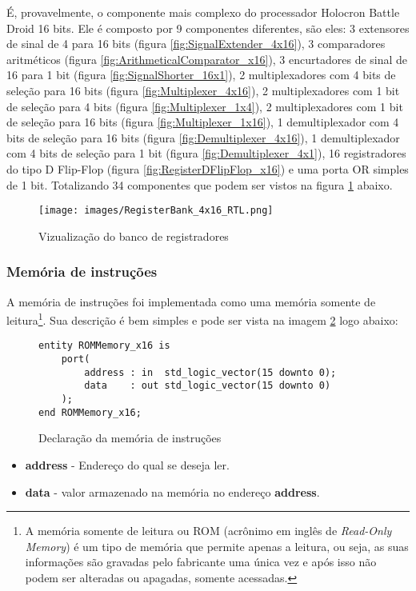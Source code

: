 \documentclass{article}
\newcommand\tab[1][0.50cm]{\hspace*{#1}}
\begin{document}
				\tab \'{E}, provavelmente, o componente mais complexo do processador Holocron Battle Droid 16 bits. Ele \'{e} composto por 9 componentes diferentes, s\~{a}o eles: 3 extensores de sinal de 4 para 16 bits (figura \ref{fig:SignalExtender_4x16}), 3 comparadores aritm\'{e}ticos (figura \ref{fig:ArithmeticalComparator_x16}), 3 encurtadores de sinal de 16 para 1 bit (figura \ref{fig:SignalShorter_16x1}), 2 multiplexadores com 4 bits de sele\c{c}\~{a}o para 16 bits (figura \ref{fig:Multiplexer_4x16}), 2 multiplexadores com 1 bit de sele\c{c}\~{a}o para 4 bits (figura \ref{fig:Multiplexer_1x4}), 2 multiplexadores com 1 bit de sele\c{c}\~{a}o para 16 bits (figura \ref{fig:Multiplexer_1x16}), 1 demultiplexador com 4 bits de sele\c{c}\~{a}o para 16 bits (figura \ref{fig:Demultiplexer_4x16}), 1 demultiplexador com 4 bits de sele\c{c}\~{a}o para 1 bit (figura \ref{fig:Demultiplexer_4x1}), 16 registradores do tipo D Flip-Flop (figura \ref{fig:RegisterDFlipFlop_x16}) e uma porta OR simples de 1 bit. Totalizando 34 componentes que podem ser vistos na figura \ref{fig:RegisterBank_4x16_RTL} abaixo.			
			\begin{figure}[H]
				\centering
				\caption[Vizualiza\c{c}\~{a}o do banco de registradores]{Vizualiza\c{c}\~{a}o do banco de registradores}
				\label{fig:RegisterBank_4x16_RTL}
				\texttt{[image: images/RegisterBank\_4x16\_RTL.png]}
			\end{figure}
			\subsubsection[Mem\'{o}ria de instru\c{c}\~{o}es]{Mem\'{o}ria de instru\c{c}\~{o}es}
				\tab A mem\'{o}ria de instru\c{c}\~{o}es foi implementada como uma mem\'{o}ria somente de leitura\footnote{A mem\'{o}ria somente de leitura ou ROM (acr\^{o}nimo em ingl\^{e}s de \textit{Read-Only Memory}) \'{e} um tipo de mem\'{o}ria que permite apenas a leitura, ou seja, as suas informa\c{c}\~{o}es s\~{a}o gravadas pelo fabricante uma \'{u}nica vez e ap\'{o}s isso n\~{a}o podem ser alteradas ou apagadas, somente acessadas.}. Sua descri\c{c}\~{a}o \'{e} bem simples e pode ser vista na imagem \ref{fig:ROMMemory_x16} logo abaixo:
				\begin{figure}[H]
					\centering
					\caption[Mem\'{o}ria de instru\c{c}\~{o}es]{Declara\c{c}\~{a}o da mem\'{o}ria de instru\c{c}\~{o}es}
					\label{fig:ROMMemory_x16}
					\begin{lstlisting}[style=vhdl]
entity ROMMemory_x16 is
	port(
		address : in  std_logic_vector(15 downto 0);
		data	: out std_logic_vector(15 downto 0)
	);
end ROMMemory_x16;
					\end{lstlisting}
				\end{figure}
				\begin{itemize}
					\item \textbf{address} - Endere\c{c}o do qual se deseja ler.
					\item \textbf{data} - valor armazenado na mem\'{o}ria no endere\c{c}o \textbf{address}.
				\end{itemize}
\end{document}
